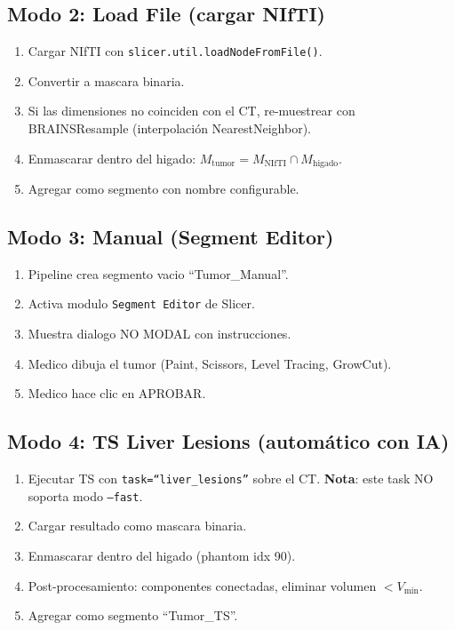 \documentclass[12pt,a4paper]{article}
\begin{document}
\subsection{Modo 2: Load File (cargar NIfTI)}

\begin{enumerate}
    \item Cargar NIfTI con \texttt{slicer.util.loadNodeFromFile()}.
    \item Convertir a mascara binaria.
    \item Si las dimensiones no coinciden con el CT, re-muestrear con BRAINSResample
          (interpolación NearestNeighbor).
    \item Enmascarar dentro del higado: $M_{\text{tumor}} = M_{\text{NIfTI}} \cap M_{\text{higado}}$.
    \item Agregar como segmento con nombre configurable.
\end{enumerate}

\subsection{Modo 3: Manual (Segment Editor)}

\begin{enumerate}
    \item Pipeline crea segmento vacio ``Tumor\_Manual''.
    \item Activa modulo \texttt{Segment Editor} de Slicer.
    \item Muestra dialogo NO MODAL con instrucciones.
    \item Medico dibuja el tumor (Paint, Scissors, Level Tracing, GrowCut).
    \item Medico hace clic en APROBAR.
\end{enumerate}

\subsection{Modo 4: TS Liver Lesions (automático con IA)}

\begin{enumerate}
    \item Ejecutar TS con \texttt{task=``liver\_lesions''} sobre el CT.
          \textbf{Nota}: este task NO soporta modo \texttt{--fast}.
    \item Cargar resultado como mascara binaria.
    \item Enmascarar dentro del higado (phantom idx 90).
    \item Post-procesamiento: componentes conectadas, eliminar volumen $< V_{\min}$.
    \item Agregar como segmento ``Tumor\_TS''.
\end{enumerate}
\end{document}
